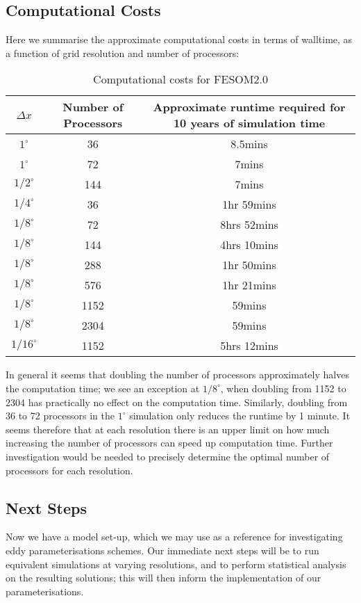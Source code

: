 \subsection{Computational Costs}

Here we summarise the approximate computational costs in terms of walltime, as a function of grid resolution and number of processors:

\begin{table}[H]        
	\centering
		\begin{tabular}{|c|c|c|}
			\hline
				    $\Delta x$	 & Number of Processors	& Approximate runtime required for 10 years of simulation time\\
			\hline
					$1^{\circ}$	& 36	& 8.5mins	\\
					$1^{\circ}$	& 72	& 7mins	\\
					$1/2^{\circ}$ & 144 & 7mins \\
					$1/4^{\circ}$	&	36 & 1hr 59mins	\\
					$1/8^{\circ}$	& 72	&  8hrs 52mins\\
					$1/8^{\circ}$	& 144	&  4hrs 10mins\\
					$1/8^{\circ}$	& 288	&  1hr 50mins\\
					$1/8^{\circ}$	& 576	&  1hr 21mins\\
					$1/8^{\circ}$	& 1152	&  59mins\\
					$1/8^{\circ}$ & 2304 & 59mins\\
					$1/16^{\circ}$ & 1152 &	5hrs 12mins\\
             \hline
		\end{tabular}
		\caption{Computational costs for FESOM2.0}
		           	\label{table:costs}
\end{table}
In general it seems that doubling the number of processors approximately halves the computation time; we see an exception at $1/8^{\circ}$, when doubling from 1152 to 2304 has practically no effect on the computation time. Similarly, doubling from 36 to 72 processors in the $1^{\circ}$ simulation only reduces the runtime by 1 minute. It seems therefore that at each resolution there is an upper limit on how much increasing the number of processors can speed up computation time. Further investigation would be needed to precisely determine the optimal number of processors for each resolution. 

\subsection{Next Steps}

Now we have a model set-up, which we may use as a reference for investigating  eddy parameterisations schemes. Our immediate next steps will be to run equivalent simulations at varying resolutions, and to perform statistical analysis on the resulting solutions; this will then inform the implementation of our parameterisations. 
